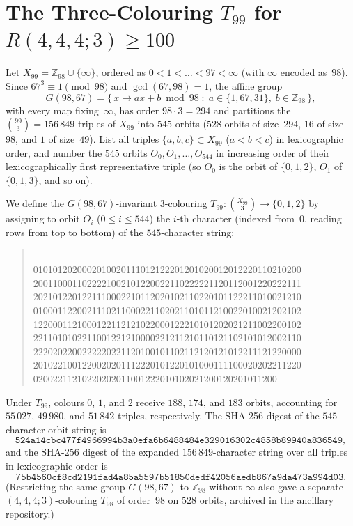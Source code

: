 \documentclass[11pt]{article}
\theoremstyle{remark}
\newcommand{\Z}{\mathbb{Z}}
\begin{document}
\section{The Three-Colouring $T_{99}$ for $R(4,4,4;3)\ge 100$}\label{sec:t99}

Let $X_{99}=\Z_{98}\cup\{\infty\}$, ordered as $0<1<\dots<97<\infty$ (with
$\infty$ encoded as~$98$). Since $67^3\equiv 1\pmod{98}$ and
$\gcd(67,98)=1$, the affine group
\[
  G(98,67)=\{\,x\mapsto a x+b \bmod 98 \;:\; a\in\{1,67,31\},\; b\in\Z_{98}\,\},
\]
with every map fixing~$\infty$, has order $98\cdot 3=294$ and partitions the
$\binom{99}{3}=156\,849$ triples of $X_{99}$ into $545$ orbits ($528$ orbits of
size~$294$, $16$ of size~$98$, and $1$ of size~$49$). List all triples
$\{a,b,c\}\subset X_{99}$ ($a<b<c$) in lexicographic order, and number the
$545$ orbits $O_0,O_1,\dots,O_{544}$ in increasing order of their
lexicographically first representative triple (so $O_0$ is the orbit of
$\{0,1,2\}$, $O_1$ of $\{0,1,3\}$, and so on).

We define the $G(98,67)$-invariant $3$-colouring $T_{99}\colon\binom{X_{99}}{3}\to\{0,1,2\}$
by assigning to orbit $O_i$ ($0\le i\le 544$) the $i$-th character (indexed
from~$0$, reading rows from top to bottom) of the $545$-character string:
\begin{quote}
\footnotesize\ttfamily{}\\
0101012020002010020111012122201201020012012220110210200\\
2001100011022221002101220022110222221120112001220222111\\
2021012201221110002210112020102110220101122211010021210\\
0100011220021110211000221102021101011210022010021202102\\
1220001121000122112121022000122210101202021211002200102\\
2211010102211001221210000221211210110121102101012002110\\
2220202200222220221120100101102112120121012211121220000\\
2010221001220020201112220101220101000111100020202211220\\
02002211210220202011001222010102021200120201011200
\end{quote}
Under $T_{99}$, colours $0$, $1$, and $2$ receive $188$, $174$, and $183$
orbits, accounting for $55\,027$, $49\,980$, and $51\,842$ triples,
respectively. The SHA-256 digest of the $545$-character orbit string is
\[
  \texttt{524a14cbc477f4966994b3a0efa6b6488484e329016302c4858b89940a836549},
\]
and the SHA-256 digest of the expanded $156\,849$-character string over all
triples in lexicographic order is
\[
  \texttt{75b4560cf8cd2191fad4a85a5597b51850dedf42056aedb867a9da473a994d03}.
\]
(Restricting the same group $G(98,67)$ to $\Z_{98}$ without $\infty$ also gave a
separate $(4,4,4;3)$-colouring $T_{98}$ of order~$98$ on $528$ orbits, archived
in the ancillary repository.)
\end{document}
